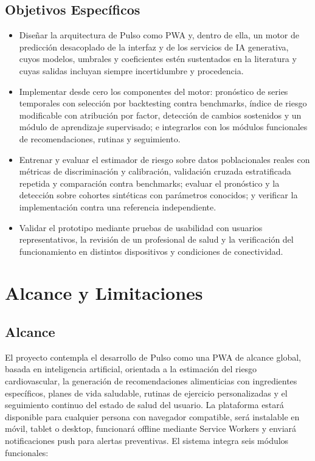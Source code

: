 \documentclass[12pt,letterpaper]{article}
\begin{document}
\subsection{Objetivos Específicos}

\begin{itemize}
  \item Diseñar la arquitectura de Pulso como PWA y, dentro de ella, un motor de
    predicción desacoplado de la interfaz y de los servicios de IA generativa,
    cuyos modelos, umbrales y coeficientes estén sustentados en la literatura y
    cuyas salidas incluyan siempre incertidumbre y procedencia.

  \item Implementar desde cero los componentes del motor: pronóstico de series
    temporales con selección por backtesting contra benchmarks, índice de riesgo
    modificable con atribución por factor, detección de cambios sostenidos y un
    módulo de aprendizaje supervisado; e integrarlos con los módulos funcionales
    de recomendaciones, rutinas y seguimiento.

  \item Entrenar y evaluar el estimador de riesgo sobre datos poblacionales
    reales con métricas de discriminación y calibración, validación cruzada
    estratificada repetida y comparación contra benchmarks; evaluar el
    pronóstico y la detección sobre cohortes sintéticas con parámetros
    conocidos; y verificar la implementación contra una referencia
    independiente.

  \item Validar el prototipo mediante pruebas de usabilidad con usuarios
    representativos, la revisión de un profesional de salud y la verificación
    del funcionamiento en distintos dispositivos y condiciones de conectividad.
\end{itemize}

\newpage

\section{Alcance y Limitaciones}

\subsection{Alcance}

El proyecto contempla el desarrollo de Pulso como una PWA de alcance global,
basada en inteligencia artificial, orientada a la estimación del riesgo
cardiovascular, la generación de recomendaciones alimenticias con ingredientes
específicos, planes de vida saludable, rutinas de ejercicio personalizadas y el
seguimiento continuo del estado de salud del usuario. La plataforma estará
disponible para cualquier persona con navegador compatible, será instalable en
móvil, tablet o desktop, funcionará offline mediante Service Workers y enviará
notificaciones push para alertas preventivas. El sistema integra seis módulos
funcionales:
\end{document}
